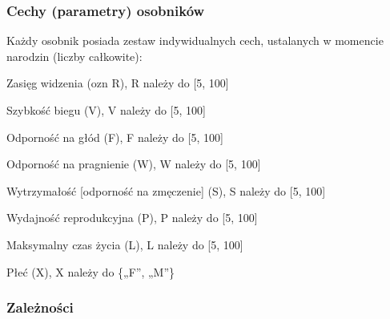 \subsubsection*{Cechy (parametry) osobników}

Każdy osobnik posiada zestaw indywidualnych cech, ustalanych w momencie narodzin (liczby całkowite)\-:


\begin{DoxyItemize}
\item Zasięg widzenia (ozn R), R należy do \mbox{[}5, 100\mbox{]}
\end{DoxyItemize}


\begin{DoxyItemize}
\item Szybkość biegu (V), V należy do \mbox{[}5, 100\mbox{]}
\end{DoxyItemize}


\begin{DoxyItemize}
\item Odporność na głód (F), F należy do \mbox{[}5, 100\mbox{]}
\end{DoxyItemize}


\begin{DoxyItemize}
\item Odporność na pragnienie (W), W należy do \mbox{[}5, 100\mbox{]}
\end{DoxyItemize}


\begin{DoxyItemize}
\item Wytrzymałość \mbox{[}odporność na zmęczenie\mbox{]} (S), S należy do \mbox{[}5, 100\mbox{]}
\end{DoxyItemize}


\begin{DoxyItemize}
\item Wydajność reprodukcyjna (P), P należy do \mbox{[}5, 100\mbox{]}
\end{DoxyItemize}


\begin{DoxyItemize}
\item Maksymalny czas życia (L), L należy do \mbox{[}5, 100\mbox{]}
\end{DoxyItemize}


\begin{DoxyItemize}
\item Płeć (X), X należy do \{„\-F”, „\-M”\}
\end{DoxyItemize}

\subsubsection*{Zależności}


